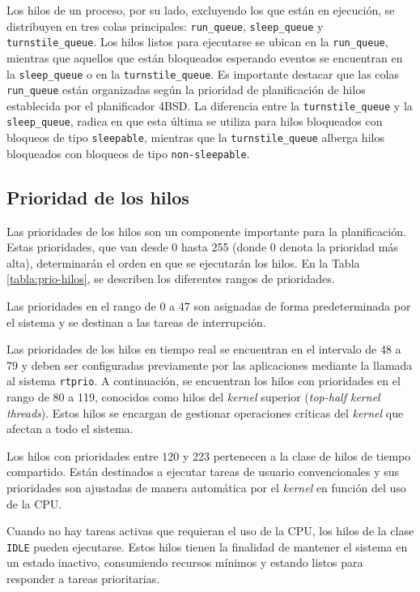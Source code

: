 Los hilos de un proceso, por su lado, excluyendo los que están en ejecución, se distribuyen en tres colas principales: \texttt{run\_queue}, \texttt{sleep\_queue} y \texttt{turnstile\_queue}. Los hilos listos para ejecutarse se ubican en la \texttt{run\_queue}, mientras que aquellos que están bloqueados esperando eventos se encuentran en la \texttt{sleep\_queue} o en la \texttt{turnstile\_queue}. Es importante destacar que las colas \texttt{run\_queue} están organizadas según la prioridad de planificación de hilos establecida por el planificador 4BSD. La diferencia entre la \texttt{turnstile\_queue} y la \texttt{sleep\_queue}, radica en que esta última se utiliza para hilos bloqueados con bloqueos de tipo \texttt{sleepable}, mientras que la \texttt{turnstile\_queue} alberga hilos bloqueados con bloqueos de tipo \texttt{non-sleepable}.

\subsection{Prioridad de los hilos}

Las prioridades de los hilos son un componente importante para la planificación. Estas prioridades, que van desde 0 hasta 255 (donde 0 denota la prioridad más alta), determinarán el orden en que se ejecutarán los hilos. En la Tabla \ref{tabla:prio-hilos}, se describen los diferentes rangos de prioridades.

Las prioridades en el rango de 0 a 47 son asignadas de forma predeterminada por el sistema y se destinan a las tareas de interrupción.\par

Las prioridades de los hilos en tiempo real se encuentran en el intervalo de 48 a 79 y deben ser configuradas previamente por las aplicaciones mediante la llamada al sistema \texttt{rtprio}. A continuación, se encuentran los hilos con prioridades en el rango de 80 a 119, conocidos como hilos del \textit{kernel} superior (\textit{top-half kernel threads}). Estos hilos se encargan de gestionar operaciones críticas del \textit{kernel} que afectan a todo el sistema.\par

Los hilos con prioridades entre 120 y 223 pertenecen a la clase de hilos de tiempo compartido. Están destinados a ejecutar tareas de usuario convencionales y sus prioridades son ajustadas de manera automática por el \textit{kernel} en función del uso de la CPU.\par

Cuando no hay tareas activas que requieran el uso de la CPU, los hilos de la clase \texttt{IDLE} pueden ejecutarse. Estos hilos tienen la finalidad de mantener el sistema en un estado inactivo, consumiendo recursos mínimos y estando listos para responder a tareas prioritarias.\par

